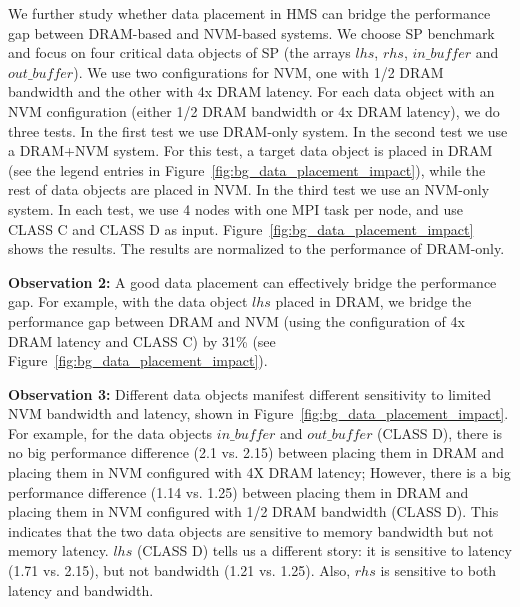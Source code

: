 
We further study whether data placement in HMS can bridge the performance gap between DRAM-based and NVM-based systems. We choose SP benchmark and focus on four critical data objects of SP (the arrays $lhs$, $rhs$, $in\_buffer$ and $out\_buffer$). We use two configurations for NVM, one with 1/2 DRAM bandwidth and the other with 4x DRAM latency.
For each data object with an NVM configuration (either 1/2 DRAM bandwidth or 4x DRAM latency),
we do three tests. In the first test we use DRAM-only system. In the second test we use
a DRAM+NVM system. For this test, a target data object is placed in DRAM (see the legend entries in Figure~\ref{fig:bg_data_placement_impact}), while the rest of
data objects are placed in NVM. In the third test we use an NVM-only system.
In each test, we use 4 nodes with one MPI task per node, and use CLASS C and CLASS D as input.
Figure~\ref{fig:bg_data_placement_impact} shows the results. 
The results are normalized to the performance of DRAM-only.

\textbf{Observation 2:}
A good data placement can effectively bridge the performance gap.
For example, with the data object $lhs$ placed in DRAM, we bridge the performance gap between DRAM and NVM (using the configuration of 4x DRAM latency and CLASS C) by 31\% (see Figure~\ref{fig:bg_data_placement_impact}).

\textbf{Observation 3:}
Different data objects manifest different sensitivity to
limited NVM bandwidth and latency, shown in Figure~\ref{fig:bg_data_placement_impact}. 
For example, for the data objects $in\_buffer$ and $out\_buffer$ (CLASS D), 
there is no big performance difference (2.1 vs. 2.15) between placing them in DRAM and placing them in NVM configured with 4X DRAM latency; 
However, 
there is a big performance difference (1.14 vs. 1.25) between placing them in DRAM and placing them in NVM configured with 1/2 DRAM bandwidth (CLASS D). 
This indicates that the two data objects are sensitive to memory bandwidth but not memory latency. 
$lhs$ (CLASS D) tells us a different story:
it is sensitive to latency (1.71 vs. 2.15), but not bandwidth (1.21 vs. 1.25). 
Also, $rhs$ is sensitive to both latency and bandwidth.

